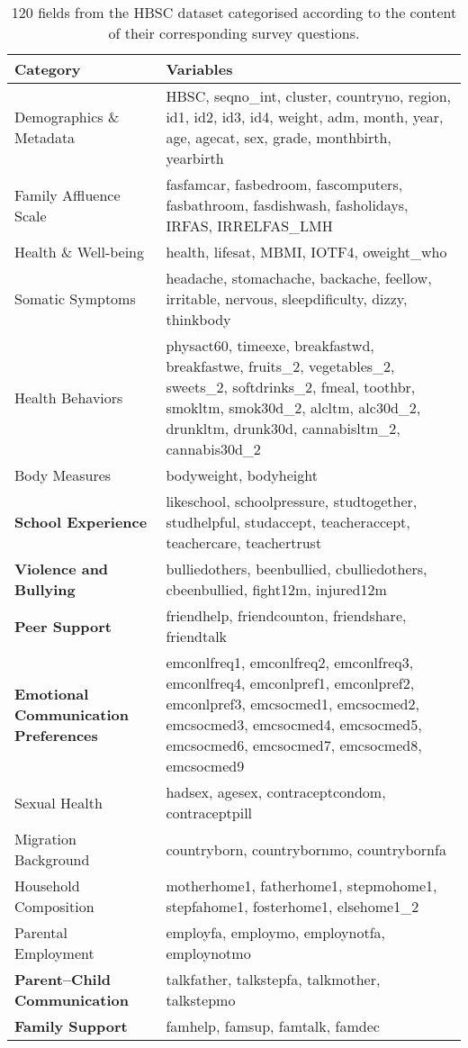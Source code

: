 \documentclass[main.tex]{subfiles}
\begin{document}
\begin{table}[!ht]
  \centering
  \begin{tabular}{|p{40mm}|p{100mm}|}
  \toprule
  \textbf{Category}&\textbf{Variables}\\
  \toprule
    Demographics \& Metadata & HBSC, seqno\_int, cluster, countryno, region, id1, id2, id3, id4, weight, adm, month, year, age, agecat, sex, grade, monthbirth, yearbirth \\ \hline
    Family Affluence Scale & fasfamcar, fasbedroom, fascomputers, fasbathroom, fasdishwash, fasholidays, IRFAS, IRRELFAS\_LMH \\ \hline
    Health \& Well-being & health, lifesat, MBMI, IOTF4, oweight\_who \\ \hline
    Somatic Symptoms & headache, stomachache, backache, feellow, irritable, nervous, sleepdificulty, dizzy, thinkbody \\ \hline
    Health Behaviors & physact60, timeexe, breakfastwd, breakfastwe, fruits\_2, vegetables\_2, sweets\_2, softdrinks\_2, fmeal, toothbr, smokltm, smok30d\_2, alcltm, alc30d\_2, drunkltm, drunk30d, cannabisltm\_2, cannabis30d\_2 \\ \hline
    Body Measures & bodyweight, bodyheight \\ \hline
    \textbf{School Experience }& likeschool, schoolpressure, studtogether, studhelpful, studaccept, teacheraccept, teachercare, teachertrust \\ \hline
    \textbf{Violence and Bullying} & bulliedothers, beenbullied, cbulliedothers, cbeenbullied, fight12m, injured12m \\ \hline
    \textbf{Peer Support} & friendhelp, friendcounton, friendshare, friendtalk \\ \hline
    \textbf{Emotional Communication Preferences} & emconlfreq1, emconlfreq2, emconlfreq3, emconlfreq4, emconlpref1, emconlpref2, emconlpref3, emcsocmed1, emcsocmed2, emcsocmed3, emcsocmed4, emcsocmed5, emcsocmed6, emcsocmed7, emcsocmed8, emcsocmed9 \\ \hline
    Sexual Health & hadsex, agesex, contraceptcondom, contraceptpill \\ \hline
    Migration Background & countryborn, countrybornmo, countrybornfa \\ \hline
    Household Composition & motherhome1, fatherhome1, stepmohome1, stepfahome1, fosterhome1, elsehome1\_2 \\ \hline
    Parental Employment & employfa, employmo, employnotfa, employnotmo \\ \hline
    \textbf{Parent–Child Communication} & talkfather, talkstepfa, talkmother, talkstepmo \\ \hline
    \textbf{Family Support} & famhelp, famsup, famtalk, famdec \\ \hline
  \end{tabular}
  \caption{120 fields from the HBSC dataset categorised according to the content of their corresponding survey questions. }
  \label{tab:hbsc_variables_grouped}
\end{table}
\end{document}
